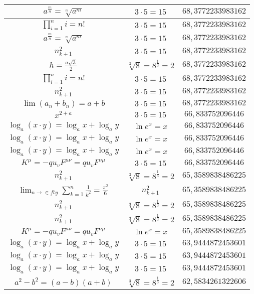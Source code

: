 \documentclass{article}
\begin{document}
\begin{flushleft}
\begin{longtable}{|c|c|c|}
$a^{\frac{m}{n}}=\sqrt[n]{a^{m}}$ & $3\cdot 5=15$ & $68,3772233983162$ \\ \hline 
$\prod_{i=1}^ni=n!$ & $3\cdot 5=15$ & $68,3772233983162$ \\ \hline 
$a^{\frac{m}{n}}=\sqrt[n]{a^{m}}$ & $3\cdot 5=15$ & $68,3772233983162$ \\ \hline 
$n_{k+1}^2$ & $3\cdot 5=15$ & $68,3772233983162$ \\ \hline 
$h=\frac{a\sqrt{3}}{2}$ & $\sqrt[3]{8}=8^{\frac{1}{3}}=2$ & $68,3772233983162$ \\ \hline 
$\prod_{i=1}^ni=n!$ & $3\cdot 5=15$ & $68,3772233983162$ \\ \hline 
$n_{k+1}^2$ & $3\cdot 5=15$ & $68,3772233983162$ \\ \hline 
$\lim\left(a_n+b_n\right)=a+b$ & $3\cdot 5=15$ & $68,3772233983162$ \\ \hline 
$x^{2+a}$ & $3\cdot 5=15$ & $66,833752096446$ \\ \hline 
$\log_{a}(x\cdot y)=\log_{a}x+\log_{a}y$ & $\ln e^x=x$ & $66,833752096446$ \\ \hline 
$\log_{a}(x\cdot y)=\log_{a}x+\log_{a}y$ & $\ln e^x=x$ & $66,833752096446$ \\ \hline 
$\log_{a}(x\cdot y)=\log_{a}x+\log_{a}y$ & $\ln e^x=x$ & $66,833752096446$ \\ \hline 
$K^\mu=-qu_vF^{\mu\nu}=qu_vF^{\nu\mu}$ & $3\cdot 5=15$ & $66,833752096446$ \\ \hline 
$n_{k+1}^2$ & $\sqrt[3]{8}=8^{\frac{1}{3}}=2$ & $65,3589838486225$ \\ \hline 
$\lim_{n\to\in fty}\sum_{k=1}^n\frac{1}{k^2}=\frac{\pi^2}{6}$ & $n_{k+1}^2$ & $65,3589838486225$ \\ \hline 
$n_{k+1}^2$ & $\sqrt[3]{8}=8^{\frac{1}{3}}=2$ & $65,3589838486225$ \\ \hline 
$n_{k+1}^2$ & $\sqrt[3]{8}=8^{\frac{1}{3}}=2$ & $65,3589838486225$ \\ \hline 
$K^\mu=-qu_vF^{\mu\nu}=qu_vF^{\nu\mu}$ & $\ln e^x=x$ & $65,3589838486225$ \\ \hline 
$\log_{a}(x\cdot y)=\log_{a}x+\log_{a}y$ & $3\cdot 5=15$ & $63,9444872453601$ \\ \hline 
$\log_{a}(x\cdot y)=\log_{a}x+\log_{a}y$ & $3\cdot 5=15$ & $63,9444872453601$ \\ \hline 
$\log_{a}(x\cdot y)=\log_{a}x+\log_{a}y$ & $3\cdot 5=15$ & $63,9444872453601$ \\ \hline 
$a^2-b^2=(a-b)(a+b)$ & $\sqrt[3]{8}=8^{\frac{1}{3}}=2$ & $62,5834261322606$ \\ \hline 

\end{longtable}
\end{flushleft}
\end{document}
